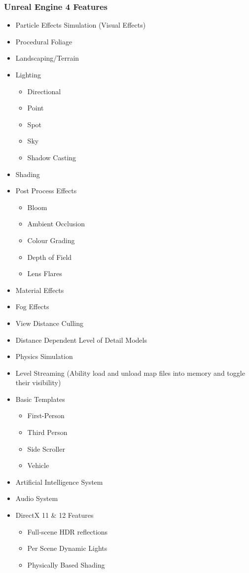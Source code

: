 \subsubsection{Unreal Engine 4 Features}
\begin{itemize}

	\item Particle Effects Simulation (Visual Effects)
	\item Procedural Foliage
	\item Landscaping/Terrain
	\item Lighting

	\begin{itemize}
		\item Directional
		\item Point
		\item Spot
		\item Sky
		\item Shadow Casting
	\end{itemize}

	\item Shading
	\item Post Process Effects

	\begin{itemize}
		\item Bloom
		\item Ambient Occlusion
		\item Colour Grading
		\item Depth of Field
		\item Lens Flares
	\end{itemize}

	\item Material Effects
	\item Fog Effects
	\item View Distance Culling
	\item Distance Dependent Level of Detail Models
	\item Physics Simulation
	\item Level Streaming (Ability load and unload map files into memory and toggle their visibility)
	\item Basic Templates

	\begin{itemize}
		\item First-Person
		\item Third Person
		\item Side Scroller
		\item Vehicle
	\end{itemize}

	\item Artificial Intelligence System
	\item Audio System
	\item DirectX 11 \& 12 Features

	\begin{itemize}
		\item Full-scene HDR reflections
		\item Per Scene Dynamic Lights
		\item Physically Based Shading
	\end{itemize}
\end{itemize}

